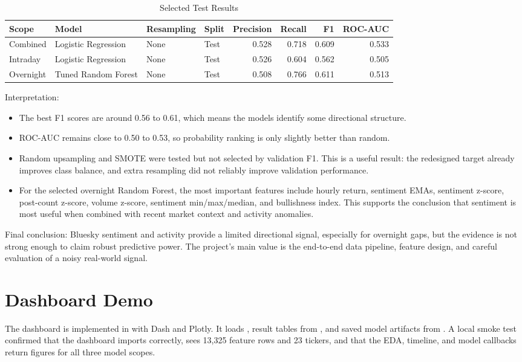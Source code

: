 \documentclass[11pt]{article}
\begin{document}
\begin{table}[H]
\centering
\caption{Selected Test Results}
\begin{tabular}{llllrrrr}
\toprule
Scope & Model & Resampling & Split & Precision & Recall & F1 & ROC-AUC \\
\midrule
Combined & Logistic Regression & None & Test & 0.528 & 0.718 & 0.609 & 0.533 \\
Intraday & Logistic Regression & None & Test & 0.526 & 0.604 & 0.562 & 0.505 \\
Overnight & Tuned Random Forest & None & Test & 0.508 & 0.766 & 0.611 & 0.513 \\
\bottomrule
\end{tabular}
\end{table}

Interpretation:

\begin{itemize}
    \item The best F1 scores are around 0.56 to 0.61, which means the models identify some directional structure.
    \item ROC-AUC remains close to 0.50 to 0.53, so probability ranking is only slightly better than random.
    \item Random upsampling and SMOTE were tested but not selected by validation F1. This is a useful result: the redesigned target already improves class balance, and extra resampling did not reliably improve validation performance.
    \item For the selected overnight Random Forest, the most important features include hourly return, sentiment EMAs, sentiment z-score, post-count z-score, volume z-score, sentiment min/max/median, and bullishness index. This supports the conclusion that sentiment is most useful when combined with recent market context and activity anomalies.
\end{itemize}

Final conclusion: Bluesky sentiment and activity provide a limited directional signal, especially for overnight gaps, but the evidence is not strong enough to claim robust predictive power. The project's main value is the end-to-end data pipeline, feature design, and careful evaluation of a noisy real-world signal.

\section{Dashboard Demo}

The dashboard is implemented in  with Dash and Plotly. It loads , result tables from , and saved model artifacts from . A local smoke test confirmed that the dashboard imports correctly, sees 13,325 feature rows and 23 tickers, and that the EDA, timeline, and model callbacks return figures for all three model scopes.
\end{document}
